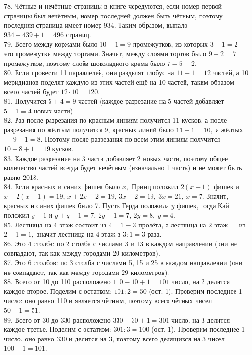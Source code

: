 \documentclass[12pt]{article}
\begin{document}
78. Чётные и нечётные страницы в книге чередуются, если номер первой страницы был нечётным, номер последней должен быть чётным, поэтому последняя страница имеет номер 934. Таким образом, выпало $934-439+1=496$ страниц.\\
79. Всего между коржами было $10-1=9$ промежутков, из которых $3-1=2$ --- это промежутки между тортами. Значит, между слоями тортов было $9-2=7$ промежутков, поэтому слоёв шоколадного крема было $7-5=2.$\\
80. Если провести 11 параллелей, они разделят глобус на $11+1=12$ частей, а 10 меридианов поделят каждую из этих частей ещё на 10 частей, таким образом всего частей будет $12\cdot10=120.$\\
81. Получится $5+4=9$ частей (каждое разрезание на 5 частей добавляет $5-1=4$ новых части).\\
82. Раз после разрезания по красным линиям получится 11 кусков, а после разрезания по жёлтым получится 9, красных линий было $11-1=10,$ а жёлтых --- $9-1=8.$ Поэтому после разрезания по всем этим линиям получится $10+8+1=19$ кусков.\\
83. Каждое разрезание на 3 части добавляет 2 новых части, поэтому общее количество частей всегда будет нечётным (изначально 1 часть) и не может быть равно 2018.\\
84. Если красных и синих фишек было $x,$ Принц положил $2(x-1)$ фишек и $x+2(x-1)=19,\ x+2x-2=19,\ 3x-2=19,\ 3x=21,\ x=7.$ Значит, красных и синих фишек было 7. Пусть Герда положила $y$ фишек, тогда Кай положил $y-1$ и $y+y-1=7,\ 2y-1=7,\ 2y=8,\ y=4.$\\
85. Лестница на 4 этаж состоит из $4-1=3$ пролёта, а лестница на 2 этаж --- из $2-1=1,$ значит лестница на 4 этаж в $3:1=3$ раза.\\
86. Это 4 столба: по 2 столба с числами 3 и 13 в каждом направлении (они не совпадают, так как между городами 20 километров).\\
87. Это 6 столбов: по 3 столба с числами 5, 15 и 25 в каждом направлении (они не совпадают, так как между городами 29 километров).\\
88. Всего от 10 до 110 расположено $110-10+1=101$ число, на 2 делится каждое второе. Поделим с остатком: $101:2=50$ (ост. 1). Проверим последнее 1 число: оно равно 110 и является чётным, поэтому всего чётных чисел $50+1=51.$\\
89. Всего от 30 до 330 расположено $330-30+1=301$ число, на 3 делится каждое третье. Поделим с остатком: $301:3=100$ (ост. 1). Проверим последнее 1 число: оно равно 330 и делится на 3, поэтому всего делящихся на 3 чисел $100+1=101.$\\
\end{document}
